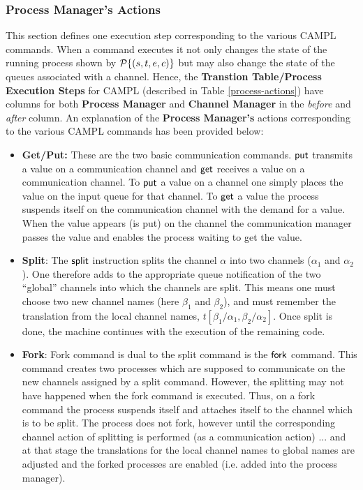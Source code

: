 \documentclass[11pt]{article}
\newcommand{\<}{\langle}
\renewcommand{\>}{\rangle}
\begin{document}
\subsubsection{Process Manager's Actions}{\label{process-manager}}
This section defines one execution step corresponding to the various CAMPL commands. When a command executes it not only changes the state of the running process shown by ${\cal P}\{ (s,t,e,c)\}$ but may also change the state of the queues associated with a channel. Hence, the {\bf Transtion Table/Process Execution Steps} for CAMPL (described in Table \ref {process-actions}) have columns for both {\bf Process Manager} and {\bf Channel Manager} in the {\em before} and {\em after} column.
An explanation of the {\bf Process Manager's} actions corresponding to the various CAMPL commands has been provided below:
\begin{itemize}
\item {\bf Get/Put:} These are the two basic communication commands. ${\sf put}$ transmits a value on a communication channel and ${\sf get}$ receives a value on a communication channel.  To ${\sf put}$ a value on a channel one simply 
places the value on the input queue for that channel. To ${\sf get}$ a value the process suspends itself on the communication channel with the demand for a value.   When the value appears (is put) on the channel the communication manager  
passes the value and enables the process waiting to get the value.

\item {\bf Split}: The ${\sf split}$ instruction splits the channel $\alpha$ into two channels ($\alpha_1$ and $\alpha_2$).  One therefore adds to the appropriate queue notification of the two ``global'' channels into which the channels are split. This means one must choose two new channel names (here $\beta_1$ and $\beta_2$), and must remember the translation from the local channel names, $t[\beta_1/\alpha_1,\beta_2/\alpha_2]$. Once {\sf split} is done, the machine continues with the execution of the remaining code.    

\item {\bf Fork}: {\sf Fork} command is dual to the {\sf split} command is the ${\sf fork}$ command.  This command creates two processes which are supposed to communicate on the new channels assigned by a  split command. However, the splitting may not have happened when the fork command is executed. Thus, on a fork command the process suspends itself and attaches itself to the channel which is to be split. The process does not fork, however 
until the corresponding channel action of splitting is performed (as a communication action)  ... and at that stage the translations for the local channel names to global names are adjusted and the forked processes are 
enabled (i.e. added into the process manager).


\end{itemize}
\end{document}

